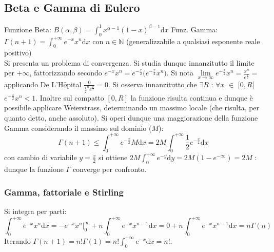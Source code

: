 \documentclass[10pt]{article}
\theoremstyle{plain}
\begin{document}
\subsection{Beta e Gamma di Eulero}
Funzione Beta: $\displaystyle B (\alpha, \beta) = \int_0^1 x^{\alpha - 1} (1 - x)^{\beta - 1}\textrm{d}x$  Funz. Gamma: $\displaystyle \Gamma(n+1) = \int_0^{+\infty} e^{-x} x^n\textrm{d}x$ con $n \in \mathbb{N}$ (generalizzabile a qualsiasi esponente reale positivo)
\\Si presenta un problema di convergenza. Si studia dunque innanzitutto il limite per $+\infty$, fattorizzando secondo $\displaystyle e^{-x}x^n = e^{-\frac{x}{2}}\big(e^{-\frac{x}{2}}x^n\big)$. Si nota $\displaystyle \lim \limits_{x \rightarrow \infty} e^{-\frac{x}{2}} x^n = \frac{x^n}{e^{\frac{x}{2}}}=$ applicando De L'H$\hat{o}$pital $\displaystyle \frac{0}{\frac{1}{2}^n e^{\frac{x}{2}}} = 0$.
Si osserva innanzitutto che $\exists R$ : $\forall x $ $\in$ $[0,R[$ $e^{-\frac{x}{2}} x^n < 1$. Inoltre sul compatto $[0,R]$ la funzione risulta continua e dunque è possibile applicare Weierstrass, determinando un massimo locale (che risulta, per quanto detto, anche assoluto).
Si operi dunque una maggiorazione della funzione Gamma considerando il massimo sul dominio ($M$):
\[\Gamma(n+1) \leq \int_0^{+\infty} e^{-\frac{x}{2}} M\textrm{d}x = 2M \int_0^{+\infty} \frac{1}{2} e^{-\frac{x}{2}}\textrm{d}x\]
con cambio di variabile $\displaystyle y = \frac{x}{2}$ si ottiene $\displaystyle 2M \int_0^{+\infty} e^{-y} \textrm{d}y = 2M (1 - e^{-\infty}) = 2M$ : dunque la funzione $\Gamma$ converge per confronto.

\subsubsection{Gamma, fattoriale e Stirling}
Si integra per parti:
\[\int_0^{+\infty} e^{-x} x^n \textrm{d}x = - e^{-x} x^n \bigg|_0^\infty + n \int_0^{+\infty} e^{-x} x^{n-1} \textrm{d}x = 0 + n \int_0^{+\infty} e^{-x} x^{n-1} \textrm{d}x = n \Gamma(n)\]
Iterando $\displaystyle \Gamma(n+1) = n! \Gamma(1) = n! \int_0^{+\infty} e^{-x} \textrm{d}x = n!$.
\end{document}
